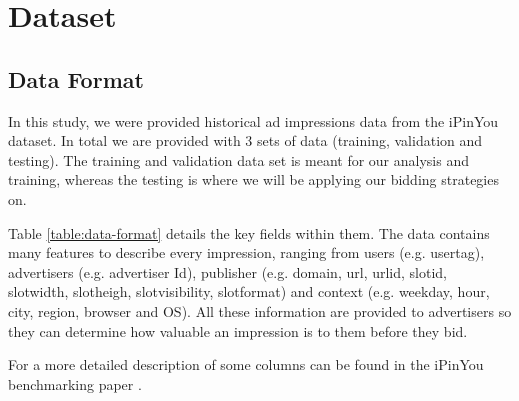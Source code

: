 \documentclass{sig-alternate-05-2015}
\begin{document}
\section{Dataset}
\subsection{Data Format}
In this study, we were provided historical ad impressions data from the iPinYou dataset. In total we are provided with 3 sets of data (training, validation and testing). The training and validation data set is meant for our analysis and training, whereas the testing is where we will be applying our bidding strategies on. 

Table \ref{table:data-format} details the key fields within them. The data contains many features to describe every impression, ranging from users (e.g. usertag), advertisers (e.g. advertiser Id), publisher (e.g. domain, url, urlid, slotid, slotwidth, slotheigh, slotvisibility, slotformat) and context (e.g. weekday, hour, city, region, browser and OS). All these information are provided to advertisers so they can determine how valuable an impression is to them before they bid.

For a more detailed description of some columns can be found in the iPinYou benchmarking paper \cite{zhang_real-time_2014}.
\end{document}
